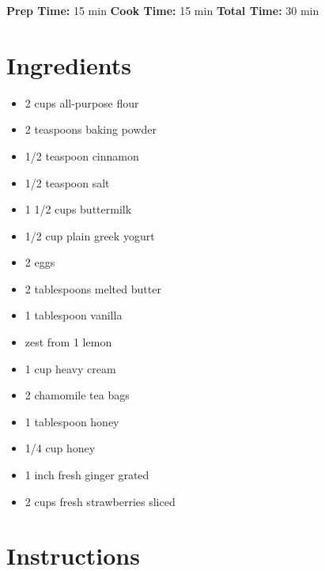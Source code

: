 \documentclass[
  letterpaper,
  DIV=11,
  numbers=noendperiod,
  titlepage=false]{scrreprt}
\providecommand{\tightlist}{%
  \setlength{\itemsep}{0pt}\setlength{\parskip}{0pt}}\usepackage{longtable,booktabs,array}
\begin{document}
\textbf{Prep Time:} 15 min \textbar{} \textbf{Cook Time:} 15 min
\textbar{} \textbf{Total Time:} 30 min

\section{Ingredients}\label{ingredients-103}

\begin{itemize}
\tightlist
\item
  2 cups all-purpose flour
\item
  2 teaspoons baking powder
\item
  1/2 teaspoon cinnamon
\item
  1/2 teaspoon salt
\item
  1 1/2 cups buttermilk
\item
  1/2 cup plain greek yogurt
\item
  2 eggs
\item
  2 tablespoons melted butter
\item
  1 tablespoon vanilla
\item
  zest from 1 lemon
\item
  1 cup heavy cream
\item
  2 chamomile tea bags
\item
  1 tablespoon honey
\item
  1/4 cup honey
\item
  1 inch fresh ginger grated
\item
  2 cups fresh strawberries sliced
\end{itemize}

\section{Instructions}\label{instructions-103}
\end{document}
